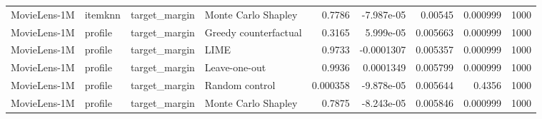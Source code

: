 \begin{table}[t]
\begin{tabular}{llllrrrrr}
MovieLens-1M & itemknn & target\_margin & Monte Carlo Shapley & 0.7786 & -7.987e-05 & 0.00545 & 0.000999 & 1000 \\
MovieLens-1M & profile & target\_margin & Greedy counterfactual & 0.3165 & 5.999e-05 & 0.005663 & 0.000999 & 1000 \\
MovieLens-1M & profile & target\_margin & LIME & 0.9733 & -0.0001307 & 0.005357 & 0.000999 & 1000 \\
MovieLens-1M & profile & target\_margin & Leave-one-out & 0.9936 & 0.0001349 & 0.005799 & 0.000999 & 1000 \\
MovieLens-1M & profile & target\_margin & Random control & 0.000358 & -9.878e-05 & 0.005644 & 0.4356 & 1000 \\
MovieLens-1M & profile & target\_margin & Monte Carlo Shapley & 0.7875 & -8.243e-05 & 0.005846 & 0.000999 & 1000 \\
\bottomrule
\end{tabular}
\end{table}

